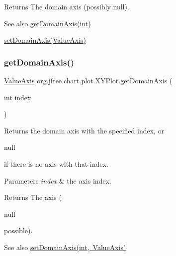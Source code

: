 \begin{DoxyReturn}{Returns}
The domain axis (possibly {\ttfamily null}).
\end{DoxyReturn}
\begin{DoxySeeAlso}{See also}
\mbox{\hyperlink{classorg_1_1jfree_1_1chart_1_1plot_1_1_x_y_plot_a7a5100655e8e30cfc464b0b4f52db0e1}{get\+Domain\+Axis(int)}} 

\mbox{\hyperlink{classorg_1_1jfree_1_1chart_1_1plot_1_1_x_y_plot_a3107d21e7a027e58e84cd5e75293d4b5}{set\+Domain\+Axis(\+Value\+Axis)}} 
\end{DoxySeeAlso}
\mbox{\label{classorg_1_1jfree_1_1chart_1_1plot_1_1_x_y_plot_a7a5100655e8e30cfc464b0b4f52db0e1}} 
\subsubsection{\texorpdfstring{get\+Domain\+Axis()}{getDomainAxis()}\hspace{0.1cm}{\footnotesize\ttfamily [2/2]}}
{\footnotesize\ttfamily \mbox{\hyperlink{classorg_1_1jfree_1_1chart_1_1axis_1_1_value_axis}{Value\+Axis}} org.\+jfree.\+chart.\+plot.\+X\+Y\+Plot.\+get\+Domain\+Axis (\begin{DoxyParamCaption}\item[{int}]{index }\end{DoxyParamCaption})}

Returns the domain axis with the specified index, or
\begin{DoxyCode}
null 
\end{DoxyCode}
 if there is no axis with that index.


\begin{DoxyParams}{Parameters}
{\em index} & the axis index.\\
\hline
\end{DoxyParams}
\begin{DoxyReturn}{Returns}
The axis (
\begin{DoxyCode}
null 
\end{DoxyCode}
 possible).
\end{DoxyReturn}
\begin{DoxySeeAlso}{See also}
\mbox{\hyperlink{classorg_1_1jfree_1_1chart_1_1plot_1_1_x_y_plot_a688e91cf072d5d4e54736212ccd81e1e}{set\+Domain\+Axis(int, Value\+Axis)}} 
\end{DoxySeeAlso}
\mbox{\label{classorg_1_1jfree_1_1chart_1_1plot_1_1_x_y_plot_a31f7f2673e1f39e5d1099252e2068076}} 
